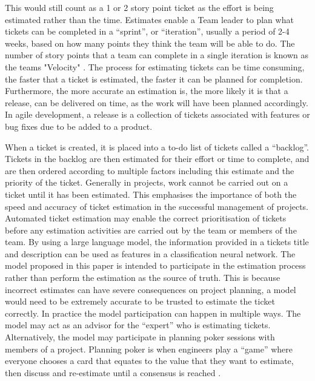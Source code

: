 \documentclass{UoYCSproject}
\begin{document}
    This would still count as a 1 or 2 story point ticket as the effort is being estimated rather than the time.
    Estimates enable a Team leader to plan what tickets can be completed in a “sprint”, or “iteration”, usually a period of 2-4 weeks, based on how many points they think the team will be able to do.
    The number of story points that a team can complete in a single iteration is known as the teams "Velocity" \cite{cohn2005agile}.
    The process for estimating tickets can be time consuming, the faster that a ticket is estimated, the faster it can be planned for completion.
    Furthermore, the more accurate an estimation is, the more likely it is that a release, can be delivered on time, as the work will have been planned accordingly.
In agile development, a release is a collection of tickets associated with features or bug fixes due to be added to a product. \par

    When a ticket is created, it is placed into a to-do list of tickets called a “backlog”.
    Tickets in the backlog are then estimated for their effort or time to complete, and are then ordered according to multiple factors including this estimate and the priority of the ticket.
    Generally in projects, work cannot be carried out on a ticket until it has been estimated.
    This emphasises the importance of both the speed and accuracy of ticket estimation in the successful management of projects.
    Automated ticket estimation may enable the correct prioritisation of tickets before any estimation activities are carried out by the team or members of the team.
    By using a large language model, the information provided in a tickets title and description can be used as features in a classification neural network.
    The model proposed in this paper is intended to participate in the estimation process rather than perform the estimation as the source of truth.
    This is because incorrect estimates can have severe consequences on project planning, a model would need to be extremely accurate to be trusted to estimate the ticket correctly.
    In practice the model participation can happen in multiple ways.
    The model may act as an advisor for the “expert” who is estimating tickets.
    Alternatively, the model may participate in planning poker sessions with members of a project.
    Planning poker is when engineers play a “game” where everyone chooses a card that equates to the value that they want to estimate, then discuss and re-estimate until a consensus is reached \cite{1667560}. \par
\end{document}

